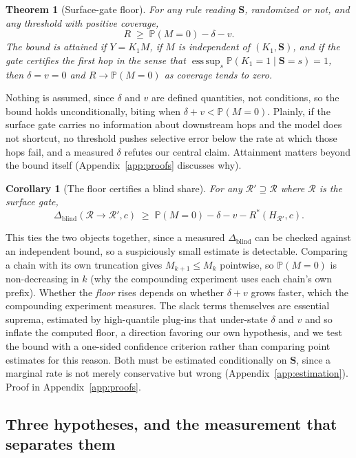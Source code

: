 \documentclass{article}
\newtheorem{theorem}{Theorem}
\newtheorem{corollary}{Corollary}
\newcommand{\esssup}{\operatorname*{ess\,sup}}
\newcommand{\gate}{\mathbf{S}}
\begin{document}
\begin{theorem}[Surface-gate floor]
\label{thm:floor}
For any rule reading $\gate$, randomized or not, and any threshold with positive coverage,
\[
R\;\ge\;\mathbb{P}(M=0)-\delta-v .
\]
The bound is attained if $Y=K_1M$, if $M$ is independent of $(K_1,\gate)$, and if the gate certifies
the first hop in the sense that $\esssup_s\mathbb{P}(K_1=1\mid\gate=s)=1$, then $\delta=v=0$ and
$R\to\mathbb{P}(M=0)$ as coverage tends to zero.
\end{theorem}

Nothing is assumed, since $\delta$ and $v$ are defined quantities, not conditions, so the bound holds
unconditionally, biting when $\delta+v<\mathbb{P}(M=0)$. Plainly, if the surface gate carries
no information about downstream hops and the model does not shortcut, no threshold pushes selective
error below the rate at which those hops fail, and a measured $\delta$ refutes our central claim.
Attainment matters beyond the bound itself (Appendix~\ref{app:proofs} discusses why).

\begin{corollary}[The floor certifies a blind share]
\label{cor:link}
For any $\mathcal{R}'\supseteq\mathcal{R}$ where $\mathcal{R}$ is the surface gate,
\[
\Delta_{\mathrm{blind}}(\mathcal{R}\to\mathcal{R}',c)\;\ge\;\mathbb{P}(M=0)-\delta-v-R^\ast(H_{\mathcal{R}'},c).
\]
\end{corollary}

This ties the two objects together, since a measured $\Delta_{\mathrm{blind}}$ can be checked against
an independent bound, so a suspiciously small estimate is detectable. Comparing a chain with its own
truncation gives $M_{k+1}\le M_k$ pointwise, so $\mathbb{P}(M=0)$ is non-decreasing in $k$ (why the
compounding experiment uses each chain's own prefix). Whether the \emph{floor} rises depends on
whether $\delta+v$ grows faster, which the compounding experiment measures. The slack terms
themselves are essential suprema, estimated by high-quantile plug-ins that under-state $\delta$ and
$v$ and so inflate the computed floor, a direction favoring our own hypothesis, and we test the bound
with a one-sided confidence criterion rather than comparing point estimates for this reason. Both
must be estimated conditionally on $\gate$, since a marginal rate is not merely conservative but
wrong (Appendix~\ref{app:estimation}). Proof in Appendix~\ref{app:proofs}.

\subsection{Three hypotheses, and the measurement that separates them}
\label{sec:hypotheses}
\end{document}
